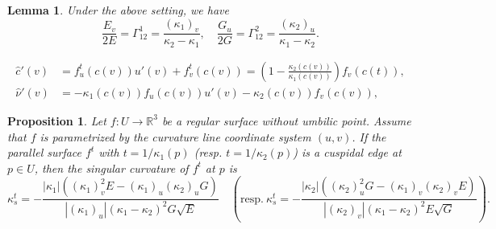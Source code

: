 \documentclass[10pt,a4paper]{amsart}
\newtheorem{lemma}{Lemma}
\newtheorem{proposition}{Proposition}
\newcommand{\R}{\mathbb{R}}
\begin{document}
\begin{lemma}\label{lem:d-kappa}
Under the above setting, we have 
\[
\frac{E_v}{2E}=\Gamma^{1}_{12}=\frac{(\kappa_1)_{v}}{\kappa_2-\kappa_1},\quad 
\frac{G_u}{2G}=\Gamma^{2}_{12}=\frac{(\kappa_2)_{u}}{\kappa_1-\kappa_2}.
\]
\end{lemma}

\begin{equation}\label{eq:diff-c}
	\begin{aligned}
		\hat{c}'(v)&=f^t_u(c(v))u'(v)+f^t_v(c(v))
		=\left(1-\frac{\kappa_2(c(v))}{\kappa_1(c(v))}\right)f_v(c(t)),\\
		\hat{\nu}'(v)&=-\kappa_1(c(v))f_u(c(v))u'(v)-\kappa_2(c(v))f_v(c(v)),
	\end{aligned}
\end{equation}

\begin{proposition}\label{prop:ks-para}
	Let $f\colon U\to\R^3$ be a regular surface without umbilic point. 
	Assume that $f$ is parametrized by the curvature line coordinate system $(u,v)$. 
	If the parallel surface $f^t$ with $t=1/\kappa_1(p)$ \textup{(}resp. $t=1/\kappa_2(p)$\textup{)} 
	is a cuspidal edge at $p\in U$, then the singular curvature of $f^t$ at $p$ is  
	\[
	\kappa_s^t=-\frac{|\kappa_1|((\kappa_1)_v^2E-(\kappa_1)_u(\kappa_2)_uG)}
	{|(\kappa_1)_u|(\kappa_1-\kappa_2)^2G\sqrt{E}}\quad 
	\left(\text{resp.}~\kappa_s^t=-\frac{|\kappa_2|((\kappa_2)_u^2G-(\kappa_1)_v(\kappa_2)_vE)}
	{|(\kappa_2)_v|(\kappa_1-\kappa_2)^2E\sqrt{G}}\right).
	\]
\end{proposition}
\end{document}
